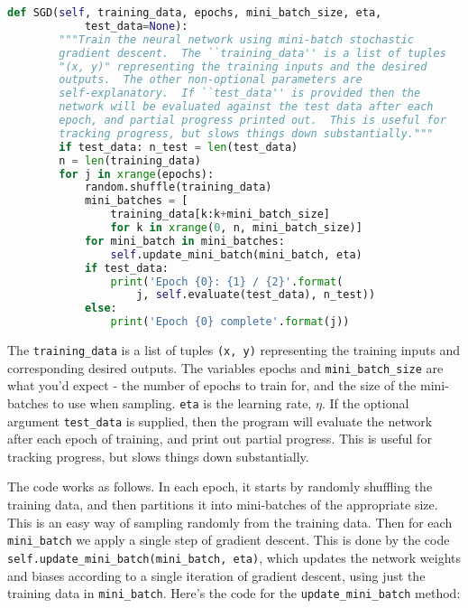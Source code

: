\begin{fullwidth}
\begin{lstlisting}[language=Python]
def SGD(self, training_data, epochs, mini_batch_size, eta,
            test_data=None):
        """Train the neural network using mini-batch stochastic
        gradient descent.  The ``training_data'' is a list of tuples
        "(x, y)" representing the training inputs and the desired
        outputs.  The other non-optional parameters are
        self-explanatory.  If ``test_data'' is provided then the
        network will be evaluated against the test data after each
        epoch, and partial progress printed out.  This is useful for
        tracking progress, but slows things down substantially."""
        if test_data: n_test = len(test_data)
        n = len(training_data)
        for j in xrange(epochs):
            random.shuffle(training_data)
            mini_batches = [
                training_data[k:k+mini_batch_size]
                for k in xrange(0, n, mini_batch_size)]
            for mini_batch in mini_batches:
                self.update_mini_batch(mini_batch, eta)
            if test_data:
                print('Epoch {0}: {1} / {2}'.format(
                    j, self.evaluate(test_data), n_test))
            else:
                print('Epoch {0} complete'.format(j))
\end{lstlisting}
\end{fullwidth}
               
The \lstinline{training_data} is a list of tuples \lstinline{(x, y)} representing the training inputs and corresponding desired outputs. The variables epochs and \lstinline{mini_batch_size} are what you'd expect - the number of epochs to train for, and the size of the mini-batches to use when sampling. \lstinline{eta} is the learning rate, $\eta$. If the optional argument \lstinline{test_data} is supplied, then the program will evaluate the network after each epoch of training, and print out partial progress. This is useful for tracking progress, but slows things down substantially.

The code works as follows. In each epoch, it starts by randomly shuffling the training data, and then partitions it into mini-batches of the appropriate size. This is an easy way of sampling randomly from the training data. Then for each \lstinline{mini_batch} we apply a single step of gradient descent. This is done by the code \lstinline{self.update_mini_batch(mini_batch, eta)}, which updates the network weights and biases according to a single iteration of gradient descent, using just the training data in \lstinline{mini_batch}. Here's the code for the \lstinline{update_mini_batch} method: 

